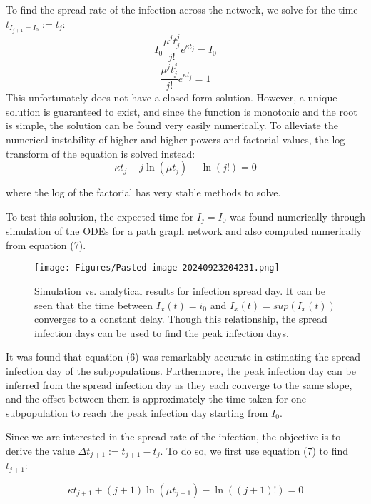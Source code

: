 \documentclass{article}
\begin{document}
To find the spread rate of the infection across the network, we solve for the time $t_{I_{j+1}=I_0} :=t_j$:
\begin{equation}
I_0 \frac{\mu^{j} t_j^{j}}{j!} e^{\kappa t_j} = I_0
\end{equation}
\begin{equation}
\frac{\mu^{j} t_j^{j}}{j!} e^{\kappa t_j} = 1 
\end{equation}
This unfortunately does not have a closed-form solution. However, a unique solution is guaranteed to exist, and since the function is monotonic and the root is simple, the solution can be found very easily numerically. To alleviate the numerical instability of higher and higher powers and factorial values, the log transform of the equation is solved instead:
\begin{equation}
\kappa t_j + j \ln(\mu t_j) - \ln(j!) = 0
\end{equation}

where the log of the factorial has very stable methods to solve\cite{C}.

To test this solution, the expected time for $I_j = I_0$ was found numerically through simulation of the ODEs for a path graph network and also computed numerically from equation (7).

\begin{figure}[!ht]
    \centering
    \texttt{[image: Figures/Pasted image 20240923204231.png]}
    \caption{\small Simulation vs. analytical results for infection spread day. It can be seen that the time between $I_x(t)=i_0$ and $I_x(t)=sup(I_x(t))$ converges to a constant delay. Though this relationship, the spread infection days can be used to find the peak infection days.}
\end{figure}

It was found that equation (6) was remarkably accurate in estimating the spread infection day of the subpopulations. Furthermore, the peak infection day can be inferred from the spread infection day as they each converge to the same slope, and the offset between them is approximately the time taken for one subpopulation to reach the peak infection day starting from $I_0$.

Since we are interested in the spread rate of the infection, the objective is to derive the value ${\Delta t}_{j+1} := t_{j+1}-t_j$. To do so, we first use equation (7) to find $t_{j+1}$:

\begin{equation}
\kappa t_{j+1} + (j+1) \ln(\mu t_{j+1}) - \ln((j+1)!) = 0 
\end{equation}
\end{document}
